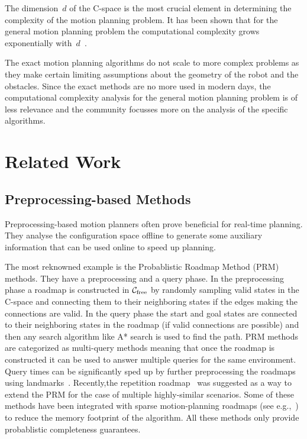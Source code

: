 \documentclass[a4paper,10pt]{article}
\begin{document}
The dimension~$d$ of the C-space is the most crucial element in determining the complexity of the motion planning problem. It has been shown that for the general motion planning problem the computational complexity grows exponentially with~$d$~\cite{chazelle1991singly}.

The exact motion planning algorithms do not scale to more complex problems as they make certain limiting assumptions about the geometry of the robot and the obstacles. Since the exact methods are no more used in modern days, the computational complexity analysis for the general motion planning problem is of less relevance and the community focusses more on the analysis of the specific algorithms.



\section{Related Work}
\subsection{Preprocessing-based Methods}
Preprocessing-based motion planners often prove beneficial for real-time planning. They analyse the configuration space offline to generate some auxiliary information that can be used online to speed up planning. 

The most reknowned example is the Probablistic Roadmap Method (PRM)~\cite{kavraki1996probabilistic} methods. They have a preprocessing and a query phase. In the preprocessing phase a roadmap is constructed in $\mathcal{C}_{\rm free}$ by randomly sampling valid states in the C-space and connecting them to their neighboring states if the edges making the connections are valid. In the query phase the start and goal states are connected to their neighboring states in the roadmap (if valid connections are possible) and then any search algorithm like A* search is used to find the path. PRM methods are categorized as multi-query methods meaning that once the roadmap is constructed it can be used to answer multiple queries for the same environment. Query times can be significantly sped up by further preprocessing the roadmaps using landmarks~\cite{paden2017landmark}. Recently,the repetition roadmap~\cite{LA18} was suggested as a way to extend the \textsf{PRM} for the case of multiple highly-similar scenarios. Some of these methods have been integrated with sparse motion-planning roadmaps (see e.g.,~\cite{SSAH14,DB14}) to reduce the memory footprint of the algorithm. All these methods only provide probablistic completeness guarantees.
\end{document}
